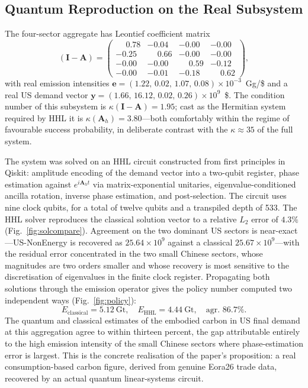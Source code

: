 \documentclass[letterpaper, 10 pt, conference]{ieeeconf}
\newcommand{\IO}{(\mathbf{I}-\mathbf{A})}
\begin{document}
\subsection{Quantum Reproduction on the Real Subsystem}

The four-sector aggregate has Leontief coefficient matrix
\begin{equation}
\IO =
\begin{pmatrix}
\phantom{-}0.78 & -0.04 & -0.00 & -0.00 \\
-0.25 & \phantom{-}0.66 & -0.00 & -0.00 \\
-0.00 & -0.00 & \phantom{-}0.59 & -0.12 \\
-0.00 & -0.01 & -0.18 & \phantom{-}0.62
\end{pmatrix},
\end{equation}
with real emission intensities $\mathbf{e}=(1.22,\,0.02,\,1.07,\,0.08)\times10^{-3}$~Gg/\$ and a real US demand vector $\mathbf{y}=(1.66,\,16.12,\,0.02,\,0.26)\times10^{9}$~\$. The condition number of this subsystem is $\kappa\IO=1.95$; cast as the Hermitian system required by HHL it is $\kappa(\mathbf{A}_h)=3.80$---both comfortably within the regime of favourable success probability, in deliberate contrast with the $\kappa\approx35$ of the full system.\par

The system was solved on an HHL circuit constructed from first principles in Qiskit: amplitude encoding of the demand vector into a two-qubit register, phase estimation against $e^{i\mathbf{A}_h t}$ via matrix-exponential unitaries, eigenvalue-conditioned ancilla rotation, inverse phase estimation, and post-selection. The circuit uses nine clock qubits, for a total of twelve qubits and a transpiled depth of 533. The HHL solver reproduces the classical solution vector to a relative $L_2$ error of $4.3\%$ (Fig.~\ref{fig:solcompare}). Agreement on the two dominant US sectors is near-exact---US-NonEnergy is recovered as $25.64\times10^9$ against a classical $25.67\times10^9$---with the residual error concentrated in the two small Chinese sectors, whose magnitudes are two orders smaller and whose recovery is most sensitive to the discretisation of eigenvalues in the finite clock register. Propagating both solutions through the emission operator gives the policy number computed two independent ways (Fig.~\ref{fig:policy}):
\begin{equation}
E_{\text{classical}} = 5.12~\text{Gt}, \quad
E_{\text{HHL}} = 4.44~\text{Gt}, \quad
\text{agr. } 86.7\%.
\end{equation}
The quantum and classical estimates of the embodied carbon in US final demand at this aggregation agree to within thirteen percent, the gap attributable entirely to the high emission intensity of the small Chinese sectors where phase-estimation error is largest. This is the concrete realisation of the paper's proposition: a real consumption-based carbon figure, derived from genuine Eora26 trade data, recovered by an actual quantum linear-systems circuit.
\end{document}
